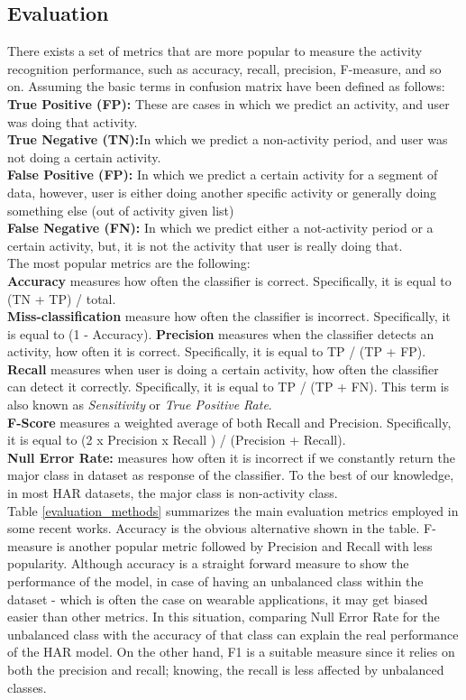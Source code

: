 \documentclass[journal,article,submit,moreauthors,pdftex]{Definitions/mdpi}
\begin{document}
\subsection{Evaluation}
There exists a set of metrics that are more popular to measure the activity recognition performance, such as accuracy, recall, precision, F-measure, and so on. Assuming the basic terms in confusion matrix have been defined as follows:\\
\textbf{True Positive (FP):} These are cases in which we predict an activity, and user was doing that activity.\\
\textbf{True Negative (TN):}In which we predict a non-activity period, and user was not doing a certain activity.\\
\textbf{False Positive (FP):} In which we predict a certain activity for a segment of data, however, user is either doing another specific activity or generally doing something else (out of activity given list)\\
\textbf{False Negative (FN):} In which we predict either a not-activity period or a certain activity, but, it is not the activity that user is really doing that.\\
The most popular metrics are the following:\\
\noindent \textbf{Accuracy} measures how often the classifier is correct. Specifically, it is equal to (TN + TP) / total.\\
\noindent \textbf{Miss-classification} measure how often the classifier is incorrect. Specifically, it is equal to (1 - Accuracy).
\noindent \textbf{Precision} measures when the classifier detects an activity, how often it is  correct. Specifically, it is equal to TP / (TP + FP). \\
\noindent \textbf{Recall} measures when user is doing a certain activity, how often the classifier can detect it correctly. Specifically, it is equal to TP / (TP + FN). This term is also known as \textit{Sensitivity} or \textit{True Positive Rate}.\\
\noindent \textbf{F-Score} measures a weighted average of both Recall and Precision. Specifically, it is equal to (2 x Precision x Recall ) / (Precision + Recall). \\
\noindent \textbf{Null Error Rate:} measures how often it is incorrect if we constantly return the major class in dataset as response of the classifier. To the best of our knowledge, in most HAR datasets, the major class is non-activity class.\\
Table \ref{evaluation_methods} summarizes the main evaluation metrics employed in some recent works. Accuracy is the obvious alternative shown in the table. F-measure is another popular metric followed by Precision and Recall with less popularity. Although accuracy is a straight forward measure to show the performance of the model, in case of having an unbalanced class within the dataset - which is often the case on wearable applications, it may get biased easier than other metrics. In this situation, comparing Null Error Rate for the unbalanced class with the accuracy of that class can explain the real performance of the HAR model. On the other hand, F1 is a suitable measure since it relies on both the precision and recall; knowing, the recall is less affected by unbalanced classes.
\end{document}
